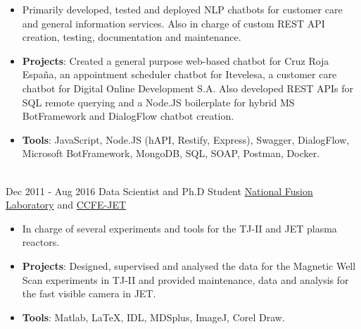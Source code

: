 \documentclass[letterpaper]{twentysecondcv} %
\begin{document}
\begin{twenty}
{{\begin{itemize}
        \item Primarily developed, tested and deployed NLP chatbots for customer care and general information services. Also in charge of custom REST API creation, testing, documentation and maintenance.
        \item \textbf{Projects}: Created a general purpose web-based chatbot for Cruz Roja Espa\~na, an appointment scheduler chatbot for Itevelesa, a customer care chatbot for Digital Online Development S.A. Also developed REST APIs for SQL remote querying and a Node.JS boilerplate for hybrid MS BotFramework and DialogFlow chatbot creation.
        \item \textbf{Tools}: JavaScript, Node.JS (hAPI, Restify, Express), Swagger, DialogFlow, Microsoft BotFramework, MongoDB, SQL, SOAP, Postman, Docker.
    \end{itemize}}
        }
     \\
     \twentyitem
   		{Dec 2011 -}
		{Aug 2016}
        {Data Scientist and Ph.D Student}
        {\href{http://www.fusion.ciemat.es/home/}{National Fusion Laboratory} and \href{https://www.euro-fusion.org/devices/jet/}{CCFE-JET}}
        {}
        {
        \begin{itemize}
        \item In charge of several experiments and tools for the TJ-II and JET plasma reactors. 
        \item \textbf{Projects}: Designed, supervised and analysed the data for the Magnetic Well Scan experiments in TJ-II and provided maintenance, data and analysis for the fast visible camera in JET.
        \item \textbf{Tools}: Matlab, \LaTeX, IDL, MDSplus, ImageJ, Corel Draw.
    \end{itemize}
    	}
        
\end{twenty}

\end{document}
